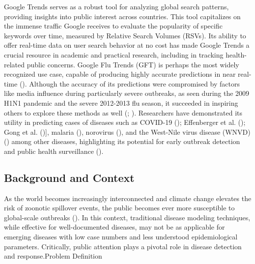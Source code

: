 \documentclass[
  12pt,
]{article}
\begin{document}
Google Trends serves as a robust tool for analyzing global search
patterns, providing insights into public interest across countries. This
tool capitalizes on the immense traffic Google receives to evaluate the
popularity of specific keywords over time, measured by Relative Search
Volumes (RSVs). Its ability to offer real-time data on user search
behavior at no cost has made Google Trends a crucial resource in
academic and practical research, including in tracking health-related
public concerns. Google Flu Trends (GFT) is perhaps the most widely
recognized use case, capable of producing highly accurate predictions in
near real-time ().
Although the accuracy of its predictions were compromised by factors
like media influence during particularly severe outbreaks, as seen
during the 2009 H1N1 pandemic and the severe 2012-2013 flu season, it
succeeded in inspiring others to explore these methods as well
(;
). Researchers have demonstrated
its utility in predicting cases of diseases such as COVID-19
(); Effenberger et al.
(); Gong et al.
(){]}, malaria
(),
norovirus (), and the West-Nile
virus disease (WNVD) ()
among other diseases, highlighting its potential for early outbreak
detection and public health surveillance
().

\subsection{Background and Context}\label{background-and-context}

As the world becomes increasingly interconnected and climate change
elevates the risk of zoonotic spillover events, the public becomes ever
more susceptible to global-scale outbreaks
(). In this context,
traditional disease modeling techniques, while effective for
well-documented diseases, may not be as applicable for emerging diseases
with low case numbers and less understood epidemiological parameters.
Critically, public attention plays a pivotal role in disease detection
and response.Problem Definition
\end{document}
